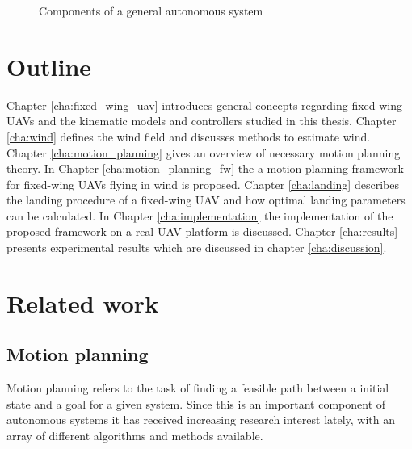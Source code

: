 \begin{figure}
    \begin{center}
    \end{center}
    \caption{Components of a general autonomous system}
    \label{fig:autonomous}
\end{figure}

\section{Outline}
Chapter \ref{cha:fixed_wing_uav} introduces general concepts regarding fixed-wing UAVs and the kinematic models and controllers studied in this thesis.
Chapter \ref{cha:wind} defines the wind field and discusses methods to estimate wind.
Chapter \ref{cha:motion_planning} gives an overview of necessary motion planning theory. In Chapter \ref{cha:motion_planning_fw} the 
a motion planning framework for fixed-wing UAVs flying in wind is proposed.
Chapter \ref{cha:landing} describes the landing procedure of a fixed-wing UAV and how optimal landing parameters can be calculated. 
In Chapter \ref{cha:implementation} the implementation of the proposed framework on a real UAV platform is discussed. Chapter \ref{cha:results} presents experimental 
results which are discussed in chapter \ref{cha:discussion}.
\section{Related work}
\subsection{Motion planning}
Motion planning refers to the task of finding a feasible path between a initial state and a goal for a given system. Since this is an important component of autonomous systems it has received increasing research interest lately, with an array of different algorithms and methods available. 


